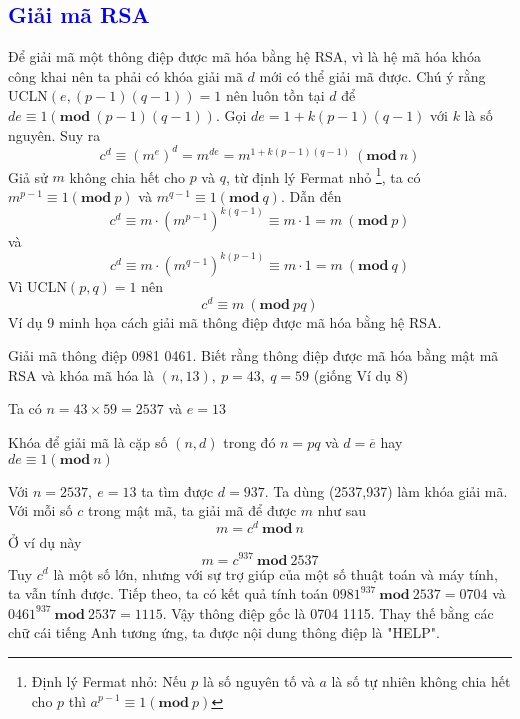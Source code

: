 \textcolor{blue}{\section{Giải mã RSA}}
Để giải mã một thông điệp được mã hóa bằng hệ RSA, vì là hệ mã hóa khóa công khai nên ta phải có khóa giải mã $d$ mới có thể giải mã được.
Chú ý rằng UCLN$(e,(p-1)(q-1)) = 1$ nên luôn tồn tại $d$ để $de \equiv 1 (\mathbf{mod}\ (p-1)(q-1))$.
Gọi $de = 1 + k(p-1)(q-1)$ với $k$ là số nguyên. Suy ra
$$c^d \equiv (m^e)^d = m^{de} = m^{1 + k(p-1)(q-1)}\ (\mathbf{mod}\ n)$$
Giả sử $m$ không chia hết cho $p$ và $q$, từ định lý Fermat nhỏ \footnote{Định lý Fermat nhỏ: Nếu $p$ là số nguyên tố và $a$ là số tự nhiên không chia hết cho $p$ thì $ a^{p-1} \equiv 1 (\mathbf{mod}\ p)$},
ta có $ m^{p-1} \equiv 1 (\mathbf{mod}\ p)$ và $ m^{q-1} \equiv 1 (\mathbf{mod}\ q)$. Dẫn đến
$$ c^d \equiv m \cdot (m^{p-1})^{k(q-1)} \equiv m \cdot 1 = m\ (\mathbf{mod}\ p)$$
và
$$ c^d \equiv m \cdot (m^{q-1})^{k(p-1)} \equiv m \cdot 1 = m\ (\mathbf{mod}\ q)$$
Vì UCLN$(p,q)=1$ nên
$$ c^d \equiv m\ (\mathbf{mod}\ pq)$$
Ví dụ 9 minh họa cách giải mã thông điệp được mã hóa bằng hệ RSA.

\begin{example}
    Giải mã thông điệp 0981 0461. Biết rằng thông điệp được mã hóa bằng mật mã RSA và khóa mã hóa là $(n,13),\ p=43,\ q=59$ (giống Ví dụ 8)
\end{example}
\begin{solution}
    Ta có $n = 43 \times 59 = 2537$ và $e = 13$

    Khóa để giải mã là cặp số $(n,d)$ trong đó $n=pq$ và $d = \overline{e}$ hay  $de \equiv 1 (\mathbf{mod}\ n)$

    Với $n=2537,\ e = 13$ ta tìm được $d=937$. Ta dùng (2537,937) làm khóa giải mã.
    Với mỗi số $c$ trong mật mã, ta giải mã để được $m$ như sau
    $$ m = c^d\ \mathbf{mod}\ n$$
    Ở ví dụ này
    $$ m = c^{937}\ \mathbf{mod}\ 2537$$
    Tuy $c^d$ là một số lớn, nhưng với sự trợ giúp của một số thuật toán và máy tính, ta vẫn tính được.
    Tiếp theo, ta có kết quả tính toán $0981^{937}\ \mathbf{mod}\ 2537 = 0704$ và $0461^{937}\ \mathbf{mod}\ 2537 = 1115$.
    Vậy thông điệp gốc là 0704 1115. Thay thế bằng các chữ cái tiếng Anh tương ứng, ta được nội dung thông điệp là "HELP".
\end{solution}